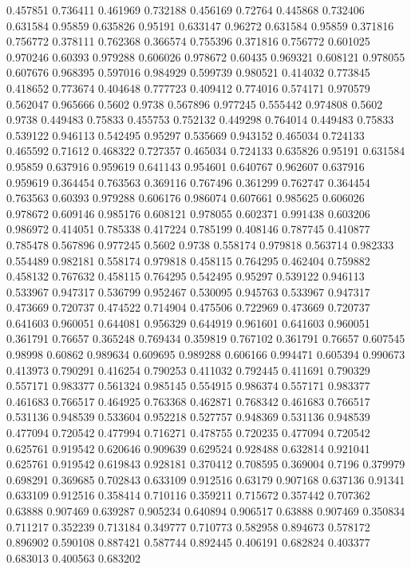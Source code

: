 0.457851 0.736411
0.461969 0.732188
0.456169 0.72764
0.445868 0.732406
0.631584 0.95859
0.635826 0.95191
0.633147 0.96272
0.631584 0.95859
0.371816 0.756772
0.378111 0.762368
0.366574 0.755396
0.371816 0.756772
0.601025 0.970246
0.60393 0.979288
0.606026 0.978672
0.60435 0.969321
0.608121 0.978055
0.607676 0.968395
0.597016 0.984929
0.599739 0.980521
0.414032 0.773845
0.418652 0.773674
0.404648 0.777723
0.409412 0.774016
0.574171 0.970579
0.562047 0.965666
0.5602 0.9738
0.567896 0.977245
0.555442 0.974808
0.5602 0.9738
0.449483 0.75833
0.455753 0.752132
0.449298 0.764014
0.449483 0.75833
0.539122 0.946113
0.542495 0.95297
0.535669 0.943152
0.465034 0.724133
0.465592 0.71612
0.468322 0.727357
0.465034 0.724133
0.635826 0.95191
0.631584 0.95859
0.637916 0.959619
0.641143 0.954601
0.640767 0.962607
0.637916 0.959619
0.364454 0.763563
0.369116 0.767496
0.361299 0.762747
0.364454 0.763563
0.60393 0.979288
0.606176 0.986074
0.607661 0.985625
0.606026 0.978672
0.609146 0.985176
0.608121 0.978055
0.602371 0.991438
0.603206 0.986972
0.414051 0.785338
0.417224 0.785199
0.408146 0.787745
0.410877 0.785478
0.567896 0.977245
0.5602 0.9738
0.558174 0.979818
0.563714 0.982333
0.554489 0.982181
0.558174 0.979818
0.458115 0.764295
0.462404 0.759882
0.458132 0.767632
0.458115 0.764295
0.542495 0.95297
0.539122 0.946113
0.533967 0.947317
0.536799 0.952467
0.530095 0.945763
0.533967 0.947317
0.473669 0.720737
0.474522 0.714904
0.475506 0.722969
0.473669 0.720737
0.641603 0.960051
0.644081 0.956329
0.644919 0.961601
0.641603 0.960051
0.361791 0.76657
0.365248 0.769434
0.359819 0.767102
0.361791 0.76657
0.607545 0.98998
0.60862 0.989634
0.609695 0.989288
0.606166 0.994471
0.605394 0.990673
0.413973 0.790291
0.416254 0.790253
0.411032 0.792445
0.411691 0.790329
0.557171 0.983377
0.561324 0.985145
0.554915 0.986374
0.557171 0.983377
0.461683 0.766517
0.464925 0.763368
0.462871 0.768342
0.461683 0.766517
0.531136 0.948539
0.533604 0.952218
0.527757 0.948369
0.531136 0.948539
0.477094 0.720542
0.477994 0.716271
0.478755 0.720235
0.477094 0.720542
0.625761 0.919542
0.620646 0.909639
0.629524 0.928488
0.632814 0.921041
0.625761 0.919542
0.619843 0.928181
0.370412 0.708595
0.369004 0.7196
0.379979 0.698291
0.369685 0.702843
0.633109 0.912516
0.63179 0.907168
0.637136 0.91341
0.633109 0.912516
0.358414 0.710116
0.359211 0.715672
0.357442 0.707362
0.63888 0.907469
0.639287 0.905234
0.640894 0.906517
0.63888 0.907469
0.350834 0.711217
0.352239 0.713184
0.349777 0.710773
0.582958 0.894673
0.578172 0.896902
0.590108 0.887421
0.587744 0.892445
0.406191 0.682824
0.403377 0.683013
0.400563 0.683202
